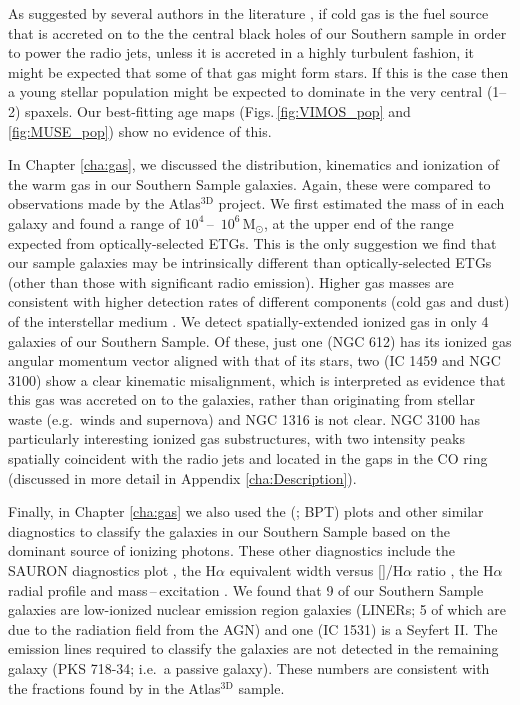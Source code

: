 As suggested by several authors in the literature \citep[e.g.][]{Collin1999, Diamond-Stanic2012, LaMassa2013}, if cold gas is the fuel source that is accreted on to the the central black holes of our Southern sample in order to power the radio jets, unless it is accreted in a highly turbulent fashion, it might be expected that some of that gas might form stars. If this is the case then a young stellar population might be expected to dominate in the very central (1--2) spaxels. Our best-fitting age maps (Figs.\,\ref{fig:VIMOS_pop} and \ref{fig:MUSE_pop}) show no evidence of this. 

In Chapter \ref{cha:gas}, we discussed the distribution, kinematics and ionization of the warm gas in our Southern Sample galaxies. Again, these were compared to observations made by the Atlas$^\text{3D}$ project. We first estimated the mass of  in each galaxy and found a range of $10^4$\,--\, $10^6\,\mathrm{M_\odot}$, at the upper end of the range expected from optically-selected ETGs. This is the only suggestion we find that our sample galaxies may be intrinsically different than optically-selected ETGs (other than those with significant radio emission). Higher gas masses are consistent with higher detection rates of different components (cold gas and dust) of the interstellar medium \citep[ISM; e.g.][]{DeRuiter2002, Leon2003, VerdoesKleijn2005}. We detect spatially-extended ionized gas in only 4 galaxies of our Southern Sample. Of these, just one (NGC 612) has its ionized gas angular momentum vector aligned with that of its stars, two (IC 1459 and NGC 3100) show a clear kinematic misalignment, which is interpreted as evidence that this gas was accreted on to the galaxies, rather than originating from stellar waste (e.g.\ winds and supernova) and NGC 1316 is not clear. NGC 3100 has particularly interesting ionized gas substructures, with two intensity peaks spatially coincident with the radio jets and located in the gaps in the CO ring (discussed in more detail in Appendix \ref{cha:Description}). 

Finally, in Chapter \ref{cha:gas} we also used the \citeauthor{Baldwin1981} (\citeyear{Baldwin1981}; BPT) plots and other similar diagnostics to classify the galaxies in our Southern Sample based on the dominant source of ionizing photons. These other diagnostics include the SAURON diagnostics plot \citep{Sarzi2010}, the H$\alpha$ equivalent width versus []/H$\alpha$ ratio \citep[WHaN2;][]{CidFernandes2011}, the H$\alpha$ radial profile and mass\,--\,excitation \citep[MEx;][]{Nyland2016}. We found that 9 of our Southern Sample galaxies are low-ionized nuclear emission region galaxies (LINERs; 5 of which are due to the radiation field from the AGN) and one (IC 1531) is a Seyfert II. The emission lines required to classify the galaxies are not detected in the remaining galaxy (PKS 718-34; i.e.\ a passive galaxy). These numbers are consistent with the fractions found by \citet{Nyland2016} in the Atlas$^\text{3D}$ sample.

